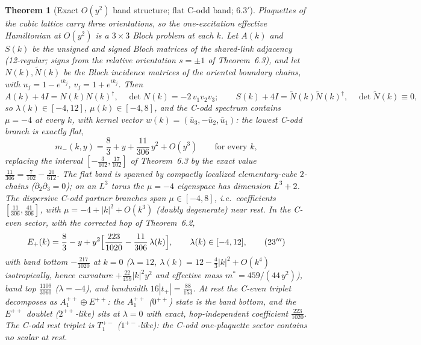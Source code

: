 \documentclass[11pt]{article}
\newtheorem{theorem}{Theorem}[section]
\begin{document}
\begin{theorem}[Exact $O(y^2)$ band structure; flat C-odd band; $6.3'$]
\label{thm:63prime}
Plaquettes of the cubic lattice carry three orientations, so the
one-excitation effective Hamiltonian at $O(y^2)$ is a $3\times3$ Bloch
problem at each $k$. Let $A(k)$ and $S(k)$ be the unsigned and signed Bloch
matrices of the shared-link adjacency (12-regular; signs from the relative
orientation $s=\pm1$ of Theorem~6.3), and let $N(k),\widetilde N(k)$ be the
Bloch incidence matrices of the oriented boundary chains, with
$u_j=1-e^{ik_j}$, $v_j=1+e^{ik_j}$. Then
\begin{equation}
A(k)+4I=N(k)N(k)^\dagger,\quad \det N(k)=-2\,v_1v_2v_3;
\qquad
S(k)+4I=\widetilde N(k)\widetilde N(k)^\dagger,\quad
\det \widetilde N(k)\equiv 0,
\tag{$23'$}
\end{equation}
so $\lambda(k)\in[-4,12]$, $\mu(k)\in[-4,8]$, and the C-odd spectrum contains
$\mu=-4$ at every $k$, with kernel vector
$w(k)=(\bar u_3,-\bar u_2,\bar u_1)$: the lowest C-odd branch is
\emph{exactly flat},
\begin{equation}
m_-(k,y)=\frac83+y+\frac{11}{306}\,y^2+O(y^3)
\qquad\text{for every }k,
\tag{$23''$}
\end{equation}
replacing the interval $[-\tfrac3{102},\tfrac{17}{102}]$ of Theorem~6.3 by
the exact value $\tfrac{11}{306}=\tfrac{7}{102}-\tfrac{20}{612}$. The flat
band is spanned by compactly localized elementary-cube $2$-chains
($\partial_2\partial_3=0$); on an $L^3$ torus the $\mu=-4$ eigenspace has
dimension $L^3+2$. The dispersive C-odd partner branches span
$\mu\in[-4,8]$, i.e.\ coefficients $[\tfrac{11}{306},\tfrac{41}{306}]$, with
$\mu=-4+|k|^2+O(k^3)$ (doubly degenerate) near rest. In the C-even sector,
with the corrected hop of Theorem~6.2,
\begin{equation}
E_+(k)=\frac83-y+y^2\Bigl[\frac{223}{1020}-\frac{11}{306}\,\lambda(k)\Bigr],
\qquad \lambda(k)\in[-4,12],
\tag{$23'''$}
\end{equation}
with band bottom $-\tfrac{217}{1020}$ at $k=0$ ($\lambda=12$,
$\lambda(k)=12-\tfrac43|k|^2+O(k^4)$ isotropically, hence curvature
$+\tfrac{22}{459}|k|^2y^2$ and effective mass $m^*=459/(44\,y^2)$), band top
$\tfrac{1109}{3060}$ ($\lambda=-4$), and bandwidth
$16|t_+|=\tfrac{88}{153}$. At rest the C-even triplet decomposes as
$A_1^{++}\oplus E^{++}$: the $A_1^{++}$ ($0^{++}$) state is the band bottom,
and the $E^{++}$ doublet ($2^{++}$-like) sits at $\lambda=0$ with exact,
hop-independent coefficient $\tfrac{223}{1020}$. The C-odd rest triplet is
$T_1^{+-}$ ($1^{+-}$-like): \emph{the C-odd one-plaquette sector contains no
scalar at rest.}
\end{theorem}
\end{document}
